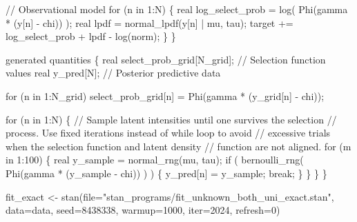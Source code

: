 \documentclass[
  letterpaper,
  DIV=11,
  numbers=noendperiod]{scrartcl}
\newenvironment{Shaded}{\begin{snugshade}}{\end{snugshade}}
\newcommand{\AttributeTok}[1]{\textcolor[rgb]{0.40,0.45,0.13}{#1}}
\newcommand{\CommentTok}[1]{\textcolor[rgb]{0.37,0.37,0.37}{#1}}
\newcommand{\ControlFlowTok}[1]{\textcolor[rgb]{0.00,0.23,0.31}{#1}}
\newcommand{\DataTypeTok}[1]{\textcolor[rgb]{0.68,0.00,0.00}{#1}}
\newcommand{\DecValTok}[1]{\textcolor[rgb]{0.68,0.00,0.00}{#1}}
\newcommand{\FunctionTok}[1]{\textcolor[rgb]{0.28,0.35,0.67}{#1}}
\newcommand{\KeywordTok}[1]{\textcolor[rgb]{0.00,0.23,0.31}{#1}}
\newcommand{\NormalTok}[1]{\textcolor[rgb]{0.00,0.23,0.31}{#1}}
\newcommand{\OtherTok}[1]{\textcolor[rgb]{0.00,0.23,0.31}{#1}}
\newcommand{\StringTok}[1]{\textcolor[rgb]{0.13,0.47,0.30}{#1}}
\begin{document}
\begin{codelisting}
\begin{Shaded}
\begin{Highlighting}[]
  \CommentTok{// Observational model}
  \ControlFlowTok{for}\NormalTok{ (n }\ControlFlowTok{in} \DecValTok{1}\NormalTok{:N) \{}
    \DataTypeTok{real}\NormalTok{ log\_select\_prob = log( Phi(gamma * (y[n] {-} chi)) );}
    \DataTypeTok{real}\NormalTok{ lpdf = normal\_lpdf(y[n] | mu, tau);}
    \KeywordTok{target +=}\NormalTok{ log\_select\_prob + lpdf {-} log(norm);}
\NormalTok{  \}}
\NormalTok{\}}

\KeywordTok{generated quantities}\NormalTok{ \{}
  \DataTypeTok{real}\NormalTok{ select\_prob\_grid[N\_grid]; }\CommentTok{// Selection function values}
  \DataTypeTok{real}\NormalTok{ y\_pred[N];                }\CommentTok{// Posterior predictive data}
  
  \ControlFlowTok{for}\NormalTok{ (n }\ControlFlowTok{in} \DecValTok{1}\NormalTok{:N\_grid)}
\NormalTok{    select\_prob\_grid[n] = Phi(gamma * (y\_grid[n] {-} chi));}
  
  \ControlFlowTok{for}\NormalTok{ (n }\ControlFlowTok{in} \DecValTok{1}\NormalTok{:N) \{}
    \CommentTok{// Sample latent intensities until one survives the selection}
    \CommentTok{// process.  Use fixed iterations instead of while loop to avoid }
    \CommentTok{// excessive trials when the selection function and latent density }
    \CommentTok{// function are not aligned.}
    \ControlFlowTok{for}\NormalTok{ (m }\ControlFlowTok{in} \DecValTok{1}\NormalTok{:}\DecValTok{100}\NormalTok{) \{}
      \DataTypeTok{real}\NormalTok{ y\_sample = normal\_rng(mu, tau);}
      \ControlFlowTok{if}\NormalTok{ ( bernoulli\_rng( Phi(gamma * (y\_sample {-} chi)) ) ) \{}
\NormalTok{        y\_pred[n] = y\_sample;}
        \ControlFlowTok{break}\NormalTok{;}
\NormalTok{      \}}
\NormalTok{    \}}
\NormalTok{  \}}
\NormalTok{\}}
\end{Highlighting}
\end{Shaded}

\end{codelisting}

\begin{Shaded}
\begin{Highlighting}[]
\NormalTok{fit\_exact }\OtherTok{\textless{}{-}} \FunctionTok{stan}\NormalTok{(}\AttributeTok{file=}\StringTok{"stan\_programs/fit\_unknown\_both\_uni\_exact.stan"}\NormalTok{,}
                  \AttributeTok{data=}\NormalTok{data, }\AttributeTok{seed=}\DecValTok{8438338}\NormalTok{,}
                  \AttributeTok{warmup=}\DecValTok{1000}\NormalTok{, }\AttributeTok{iter=}\DecValTok{2024}\NormalTok{, }\AttributeTok{refresh=}\DecValTok{0}\NormalTok{)}
\end{Highlighting}
\end{Shaded}
\end{document}
